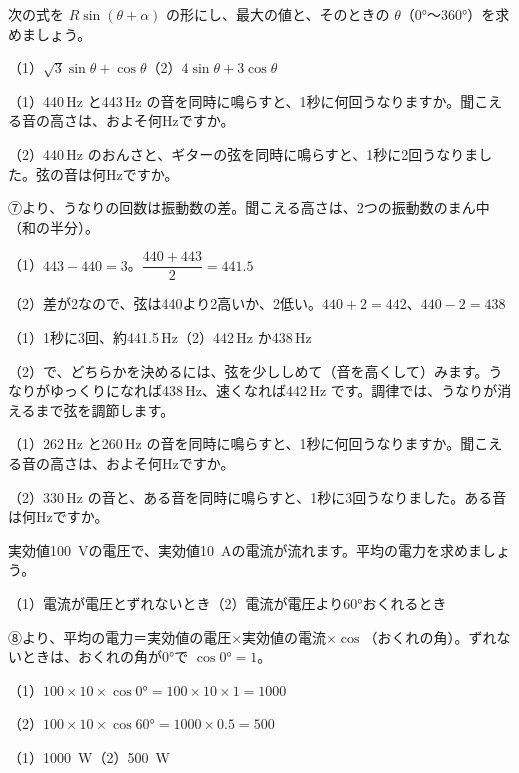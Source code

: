 \begin{jibun}
次の式を $R\sin(\theta+\alpha)$ の形にし、最大の値と、そのときの $\theta$（0°〜360°）を求めましょう。\par
（1）$\sqrt3\sin\theta+\cos\theta$\quad（2）$4\sin\theta+3\cos\theta$
\end{jibun}

\begin{reidai}[うなりの回数]
（1）440\,Hz と443\,Hz の音を同時に鳴らすと、1秒に何回うなりますか。聞こえる音の高さは、およそ何Hzですか。\par
（2）440\,Hz のおんさと、ギターの弦を同時に鳴らすと、1秒に2回うなりました。弦の音は何Hzですか。\par
\kangaekata ⑦より、うなりの回数は振動数の差。聞こえる高さは、2つの振動数のまん中（和の半分）。\par
\shiki{}\zw{} （1）$443-440=3$。$\dfrac{440+443}{2}=441.5$\par
\bkivjq （2）差が2なので、弦は440より2高いか、2低い。$440+2=442$、$440-2=438$\par
\kotae{}\zw{} （1）1秒に3回、約441.5\,Hz\quad（2）442\,Hz か438\,Hz
\end{reidai}
（2）で、どちらかを決めるには、弦を少ししめて（音を高くして）みます。うなりがゆっくりになれば438\,Hz、速くなれば442\,Hz です。調律では、うなりが消えるまで弦を調節します。

\begin{jibun}
（1）262\,Hz と260\,Hz の音を同時に鳴らすと、1秒に何回うなりますか。聞こえる音の高さは、およそ何Hzですか。\par
（2）330\,Hz の音と、ある音を同時に鳴らすと、1秒に3回うなりました。ある音は何Hzですか。
\end{jibun}

\begin{reidai}[交流の平均の電力]
実効値\qty{100}{V}の電圧で、実効値\qty{10}{A}の電流が流れます。平均の電力を求めましょう。\par
（1）電流が電圧とずれないとき\quad（2）電流が電圧より60°おくれるとき\par
\kangaekata ⑧より、平均の電力＝実効値の電圧×実効値の電流×$\cos$（おくれの角）。ずれないときは、おくれの角が0°で $\cos0°=1$。\par
\shiki{}\zw{} （1）$100\times10\times\cos0°=100\times10\times1=1000$\par
\bkivjq （2）$100\times10\times\cos60°=1000\times0.5=500$\par
\kotae{}\zw{} （1）\qty{1000}{W}\quad（2）\qty{500}{W}
\end{reidai}

